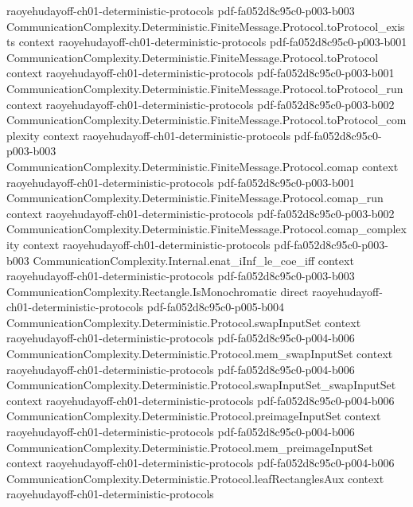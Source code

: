\begin{lemma}
  {raoyehudayoff-ch01-deterministic-protocols}
  {pdf-fa052d8c95c0-p003-b003}
\proofstep
  {CommunicationComplexity.Deterministic.FiniteMessage.Protocol.toProtocol_exists}
  {context}
  {raoyehudayoff-ch01-deterministic-protocols}
  {pdf-fa052d8c95c0-p003-b001}
\proofstep
  {CommunicationComplexity.Deterministic.FiniteMessage.Protocol.toProtocol}
  {context}
  {raoyehudayoff-ch01-deterministic-protocols}
  {pdf-fa052d8c95c0-p003-b001}
\proofstep
  {CommunicationComplexity.Deterministic.FiniteMessage.Protocol.toProtocol_run}
  {context}
  {raoyehudayoff-ch01-deterministic-protocols}
  {pdf-fa052d8c95c0-p003-b002}
\proofstep
  {CommunicationComplexity.Deterministic.FiniteMessage.Protocol.toProtocol_complexity}
  {context}
  {raoyehudayoff-ch01-deterministic-protocols}
  {pdf-fa052d8c95c0-p003-b003}
\proofstep
  {CommunicationComplexity.Deterministic.FiniteMessage.Protocol.comap}
  {context}
  {raoyehudayoff-ch01-deterministic-protocols}
  {pdf-fa052d8c95c0-p003-b001}
\proofstep
  {CommunicationComplexity.Deterministic.FiniteMessage.Protocol.comap_run}
  {context}
  {raoyehudayoff-ch01-deterministic-protocols}
  {pdf-fa052d8c95c0-p003-b002}
\proofstep
  {CommunicationComplexity.Deterministic.FiniteMessage.Protocol.comap_complexity}
  {context}
  {raoyehudayoff-ch01-deterministic-protocols}
  {pdf-fa052d8c95c0-p003-b003}
\proofstep
  {CommunicationComplexity.Internal.enat_iInf_le_coe_iff}
  {context}
  {raoyehudayoff-ch01-deterministic-protocols}
  {pdf-fa052d8c95c0-p003-b003}
\proofstep
  {CommunicationComplexity.Rectangle.IsMonochromatic}
  {direct}
  {raoyehudayoff-ch01-deterministic-protocols}
  {pdf-fa052d8c95c0-p005-b004}
\proofstep
  {CommunicationComplexity.Deterministic.Protocol.swapInputSet}
  {context}
  {raoyehudayoff-ch01-deterministic-protocols}
  {pdf-fa052d8c95c0-p004-b006}
\proofstep
  {CommunicationComplexity.Deterministic.Protocol.mem_swapInputSet}
  {context}
  {raoyehudayoff-ch01-deterministic-protocols}
  {pdf-fa052d8c95c0-p004-b006}
\proofstep
  {CommunicationComplexity.Deterministic.Protocol.swapInputSet_swapInputSet}
  {context}
  {raoyehudayoff-ch01-deterministic-protocols}
  {pdf-fa052d8c95c0-p004-b006}
\proofstep
  {CommunicationComplexity.Deterministic.Protocol.preimageInputSet}
  {context}
  {raoyehudayoff-ch01-deterministic-protocols}
  {pdf-fa052d8c95c0-p004-b006}
\proofstep
  {CommunicationComplexity.Deterministic.Protocol.mem_preimageInputSet}
  {context}
  {raoyehudayoff-ch01-deterministic-protocols}
  {pdf-fa052d8c95c0-p004-b006}
\proofstep
  {CommunicationComplexity.Deterministic.Protocol.leafRectanglesAux}
  {context}
  {raoyehudayoff-ch01-deterministic-protocols}

\end{lemma}

